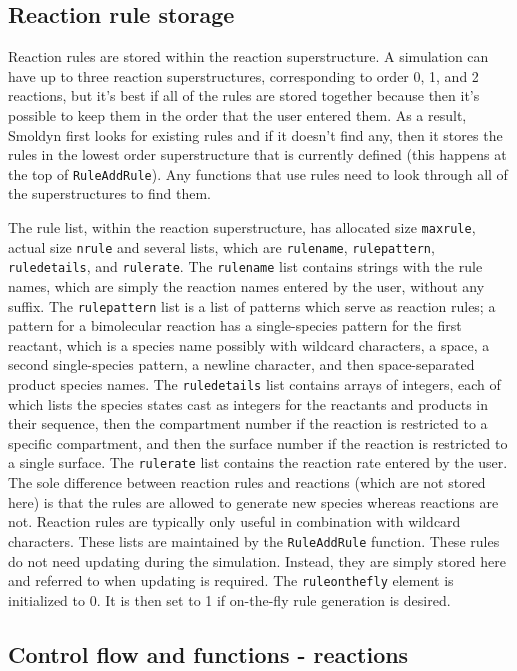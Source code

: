 \documentclass {scrbook}
\newcommand {\ttt} {\texttt}
\begin{document}
\subsection{Reaction rule storage}

Reaction rules are stored within the reaction superstructure. A simulation can have up to three reaction superstructures, corresponding to order 0, 1, and 2 reactions, but it's best if all of the rules are stored together because then it's possible to keep them in the order that the user entered them. As a result, Smoldyn first looks for existing rules and if it doesn't find any, then it stores the rules in the lowest order superstructure that is currently defined (this happens at the top of \ttt{RuleAddRule}). Any functions that use rules need to look through all of the superstructures to find them.

The rule list, within the reaction superstructure, has allocated size \ttt{maxrule}, actual size \ttt{nrule} and several lists, which are \ttt{rulename}, \ttt{rulepattern}, \ttt{ruledetails}, and \ttt{rulerate}. The \ttt{rulename} list contains strings with the rule names, which are simply the reaction names entered by the user, without any suffix. The \ttt{rulepattern} list is a list of patterns which serve as reaction rules; a pattern for a bimolecular reaction has a single-species pattern for the first reactant, which is a species name possibly with wildcard characters, a space, a second single-species pattern, a newline character, and then space-separated product species names. The \ttt{ruledetails} list contains arrays of integers, each of which lists the species states cast as integers for the reactants and products in their sequence, then the compartment number if the reaction is restricted to a specific compartment, and then the surface number if the reaction is restricted to a single surface. The \ttt{rulerate} list contains the reaction rate entered by the user. The sole difference between reaction rules and reactions (which are not stored here) is that the rules are allowed to generate new species whereas reactions are not. Reaction rules are typically only useful in combination with wildcard characters. These lists are maintained by the \ttt{RuleAddRule} function. These rules do not need updating during the simulation. Instead, they are simply stored here and referred to when updating is required. The \ttt{ruleonthefly} element is initialized to 0. It is then set to 1 if on-the-fly rule generation is desired.

\subsection{Control flow and functions - reactions}
\end{document}
